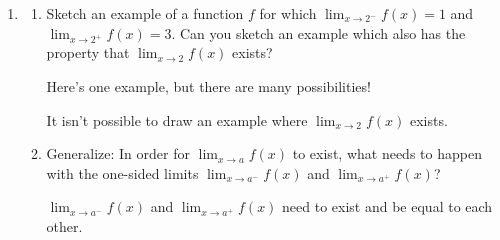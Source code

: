\documentclass{article}
\begin{document}
\begin{enumerate}[resume]
\item 

  \begin{enumerate}
  \item

    \begin{problem}[\vfill]
      Sketch an example of a function $f$ for which $\displaystyle \lim_{x \to 2^-} f(x) = 1$ and $\displaystyle \lim_{x \to 2^+} f(x) = 3$. Can you sketch an example which also has the property that $\displaystyle \lim_{x \to 2} f(x)$ exists?
    \end{problem}

    \begin{solution}
      Here's one example, but there are many possibilities!
      \begin{center}
      \end{center}
      It isn't possible to draw an example where $\displaystyle \lim_{x \to 2} f(x)$ exists.
    \end{solution}

  \item


    \begin{problem}[\vfill\newpage]
      Generalize: In order for $\displaystyle \lim_{x \to a} f(x)$ to exist, what needs to happen with the one-sided limits $\displaystyle \lim_{x \to a^-} f(x)$ and $\displaystyle \lim_{x \to a^+} f(x)$?
    \end{problem}

    \begin{solution}
      $\displaystyle \lim_{x \to a^-} f(x)$ and $\displaystyle \lim_{x \to a^+} f(x)$ need to exist and be equal to each other.
    \end{solution}

  \end{enumerate}


\end{enumerate}
\end{document}
